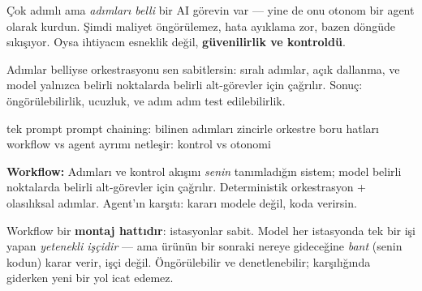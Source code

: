 

Çok adımlı ama \emph{adımları belli} bir AI görevin var --- yine de onu otonom
bir agent olarak kurdun. Şimdi maliyet öngörülemez, hata ayıklama zor, bazen
döngüde sıkışıyor. Oysa ihtiyacın esneklik değil, \textbf{güvenilirlik ve
kontroldü}.


Adımlar belliyse orkestrasyonu sen sabitlersin: sıralı adımlar, açık dallanma,
ve model yalnızca belirli noktalarda belirli alt-görevler için çağrılır. Sonuç:
öngörülebilirlik, ucuzluk, ve adım adım test edilebilirlik.

\begin{timeline}
 tek prompt \tlsep {} prompt chaining: bilinen adımları zincirle \tlsep {} orkestre boru hatları \tlsep {} workflow vs agent ayrımı netleşir: kontrol vs otonomi
\end{timeline}

\begin{problembox}
\textbf{Workflow:} Adımları ve kontrol akışını \emph{senin} tanımladığın sistem;
model belirli noktalarda belirli alt-görevler için çağrılır. Deterministik
orkestrasyon + olasılıksal adımlar. Agent'ın karşıtı: kararı modele değil,
koda verirsin.
\end{problembox}

\begin{mentalbox}
Workflow bir \textbf{montaj hattıdır}: istasyonlar sabit. Model her istasyonda
tek bir işi yapan \emph{yetenekli işçidir} --- ama ürünün bir sonraki nereye
gideceğine \emph{bant} (senin kodun) karar verir, işçi değil. Öngörülebilir ve
denetlenebilir; karşılığında giderken yeni bir yol icat edemez.
\end{mentalbox}

